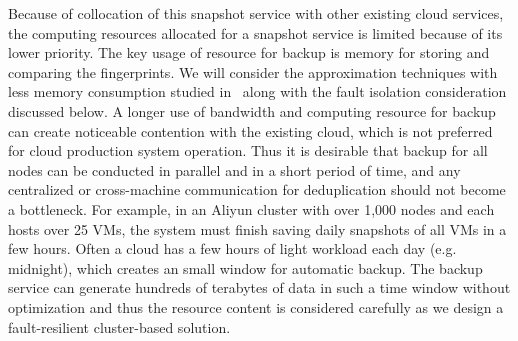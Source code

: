 Because of collocation of this snapshot service with other existing cloud services, 
the computing resources allocated for a snapshot service is limited
because of its lower priority.  
The key usage of resource for backup is memory for storing and comparing the fingerprints. 
We will consider the approximation techniques with less memory consumption
studied in~\cite{extreme_binning09,Guo2011} along with the fault isolation consideration discussed below. 
A  longer use of bandwidth and computing resource  for backup can create  noticeable  contention with 
the existing cloud, which is not preferred for cloud production system operation. 
Thus it is desirable that backup for all nodes
can be conducted in parallel and in a short period of time,
and any centralized or  cross-machine communication for
deduplication should not become a bottleneck.
For example, in an Aliyun cluster with over 1,000 nodes and each hosts over 25 VMs, 
the system must finish saving daily snapshots of all VMs in a few hours. 
Often a cloud has a few hours of light workload each day (e.g. midnight),  
which creates an small window for automatic backup.
The backup service can generate hundreds of terabytes of data in such a time window
without optimization and thus the resource content is considered carefully as we design
a fault-resilient cluster-based solution. 




